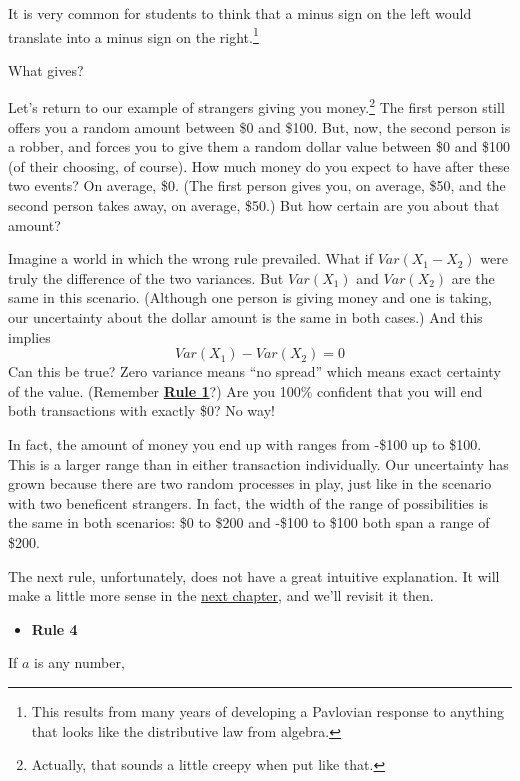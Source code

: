 \documentclass[
]{book}
\providecommand{\tightlist}{%
  \setlength{\itemsep}{0pt}\setlength{\parskip}{0pt}}
\begin{document}
It is very common for students to think that a minus sign on the left would translate into a minus sign on the right.\footnote{This results from many years of developing a Pavlovian response to anything that looks like the distributive law from algebra.}

What gives?

Let's return to our example of strangers giving you money.\footnote{Actually, that sounds a little creepy when put like that.} The first person still offers you a random amount between \$0 and \$100. But, now, the second person is a robber, and forces you to give them a random dollar value between \$0 and \$100 (of their choosing, of course). How much money do you expect to have after these two events? On average, \$0. (The first person gives you, on average, \$50, and the second person takes away, on average, \$50.) But how certain are you about that amount?

Imagine a world in which the wrong rule prevailed. What if \(Var\left(X_{1} - X_{2}\right)\) were truly the difference of the two variances. But \(Var\left(X_{1}\right)\) and \(Var\left(X_{2}\right)\) are the same in this scenario. (Although one person is giving money and one is taking, our uncertainty about the dollar amount is the same in both cases.) And this implies
\[
Var\left(X_{1}\right) - Var\left(X_{2}\right) = 0
\]
Can this be true? Zero variance means ``no spread'' which means exact certainty of the value. (Remember \protect\hyperlink{Rule1}{\textbf{Rule 1}}?) Are you 100\% confident that you will end both transactions with exactly \$0? No way!

In fact, the amount of money you end up with ranges from -\$100 up to \$100. This is a larger range than in either transaction individually. Our uncertainty has grown because there are two random processes in play, just like in the scenario with two beneficent strangers. In fact, the width of the range of possibilities is the same in both scenarios: \$0 to \$200 and -\$100 to \$100 both span a range of \$200.

The next rule, unfortunately, does not have a great intuitive explanation. It will make a little more sense in the \protect\hyperlink{covariance}{next chapter}, and we'll revisit it then.

\begin{itemize}
\tightlist
\item
  \textbf{Rule 4}
\end{itemize}

If \(a\) is any number,
\end{document}
